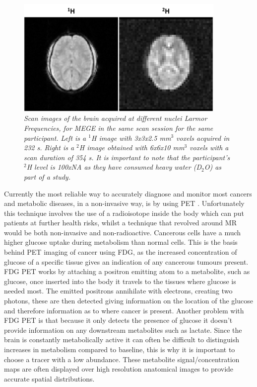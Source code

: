 \begin{figure}[ht]
    \centering
    \includegraphics[width=0.9\textwidth]{Figures/Intro/1H2H_Brain.png}
    \caption{\textit{Scan images of the brain acquired at different nuclei Larmor Frequencies, for \ac{MEGE} in the same scan session for the same participant. Left is a $^1$H image with 3x3x2.5 mm$^3$ voxels acquired in 232 s. Right is a $^2$H image obtained with 6x6x10 mm$^3$ voxels with a scan duration of 354 s. It is important to note that the participant's $^2$H level is 100x\ac{NA} as they have consumed heavy water (D$_2$O) as part of a study.}}
    \label{fig:intro:1H2H_Brain}
\end{figure}

Currently the most reliable way to accurately diagnose and monitor most cancers and metabolic diseases, in a non-invasive way, is by using \ac{PET} \cite{Almuhaideb201118F-FDGOncology}. Unfortunately this technique involves the use of a radioisotope inside the body which can put patients at further health risks, whilst a technique that revolved around MR would be both non-invasive and non-radioactive. Cancerous cells have a much higher glucose uptake during metabolism than normal cells. This is the basis behind PET imaging of cancer using \ac{FDG}, as the increased concentration of glucose of a specific tissue gives an indication of any cancerous tumours present. \ac{FDG} \ac{PET} works by attaching a positron emitting atom to a metabolite, such as glucose, once inserted into the body it travels to the tissues where glucose is needed most. The emitted positrons annihilate with electrons, creating two photons, these are then detected giving information on the location of the glucose and therefore information as to where cancer is present. Another problem with \ac{FDG} \ac{PET} is that because it only detects the presence of glucose it doesn't provide information on any downstream metabolites such as lactate. Since the brain is constantly metabolically active it can often be difficult to distinguish increases in metabolism compared to baseline, this is why it is important to choose a tracer with a low abundance. These metabolite signal/concentration maps are often displayed over high resolution anatomical images to provide accurate spatial distributions.


